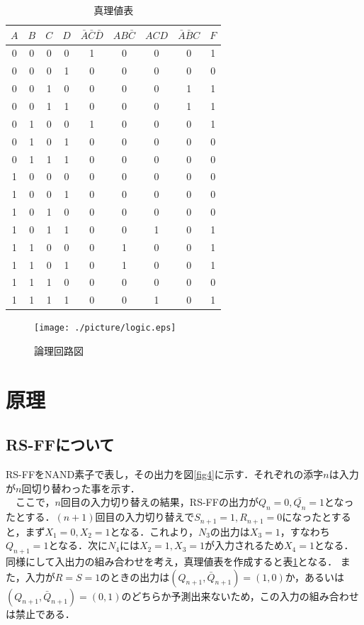 \documentclass[11pt,a4paper]{jsarticle}
\begin{document}
  \begin{table}[h]
   \centering
 \caption{真理値表}
   \label{tab2}
   \begin{tabular}{|c|c|c|c||c|c|c|c||c|} \hline
    $A$ & $B$ & $C$ & $D$ & $\bar A\bar C\bar D$ & $AB\bar C$ & $ACD$ & $\bar A\bar BC$ & $F$\\ \hline
    0& 0& 0& 0&1 &0 &0 &0 & 1\\ \hline
    0& 0& 0& 1& 0& 0& 0&0 & 0\\ \hline
    0& 0& 1& 0& 0& 0& 0& 1& 1\\ \hline
    0& 0& 1& 1& 0& 0& 0& 1& 1\\ \hline
    0& 1& 0& 0& 1& 0& 0& 0& 1\\ \hline
    0& 1& 0& 1& 0& 0& 0& 0& 0\\ \hline
    0& 1& 1& 1& 0& 0& 0& 0& 0\\ \hline
    1& 0& 0& 0& 0& 0& 0& 0& 0\\ \hline
    1& 0& 0& 1& 0& 0& 0& 0& 0\\ \hline
    1& 0& 1& 0& 0& 0& 0& 0& 0\\ \hline
    1& 0& 1& 1& 0& 0& 1& 0& 1\\ \hline
    1& 1& 0& 0& 0& 1& 0& 0& 1\\ \hline
    1& 1& 0& 1& 0& 1& 0& 0& 1\\ \hline
    1& 1& 1& 0& 0& 0& 0& 0& 0\\ \hline
    1& 1& 1& 1& 0& 0& 1& 0& 1\\ \hline
   \end{tabular}
  \end{table}

\begin{figure}[H]
 \begin{center}
  \texttt{[image: ./picture/logic.eps]}
  \caption{論理回路図}
  \label{fig3}
 \end{center}
\end{figure}


\newpage
\thispagestyle{fancy}
\cfoot{}
\setcounter{section}{1}

\section{原理}
\subsection{RS-FFについて}
RS-FFをNAND素子で表し，その出力を図\ref{fig4}に示す．それぞれの添字$n$は入力が$n$回切り替わった事を示す．\\
　ここで，$n$回目の入力切り替えの結果，RS-FFの出力が$Q_n = 0,\bar{Q_n} = 1$となったとする．$(n+1)$回目の入力切り替えで$S_{n+1} = 1,R_{n+1} = 0$になったとすると，まず$X_1 = 0,X_2 = 1$となる．これより，$N_3$の出力は$X_3 = 1$，すなわち$Q_{n+1} = 1$となる．次に$N_4$には$X_2 = 1,X_3 = 1$が入力されるため$X_4 = 1$となる．同様にして入出力の組み合わせを考え，真理値表を作成すると表\ref{tab2}となる．
また，入力が$R=S=1$のときの出力は$(Q_{n+1},\bar Q_{n+1}) = (1,0)$か，あるいは$(Q_{n+1},\bar Q_{n+1}) = (0,1)$のどちらか予測出来ないため，この入力の組み合わせは禁止である．
\end{document}
